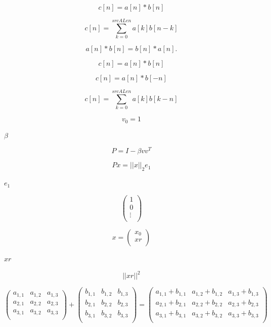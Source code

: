\documentclass{article}
\begin{document}
\[                     c[n] = a[n] * b[n]
\]
\pagebreak

\[                  c[n] = \sum_{k=0}^{srcALen} a[k] b[n-k]
\]
\pagebreak

\[                     a[n] * b[n] = b[n] * a[n].
\]
\pagebreak

\[                 c[n] = a[n] * b[n]
\]
\pagebreak

\[                 c[n] = a[n] * b[-n]
\]
\pagebreak

\[                 c[n] = \sum_{k=0}^{srcALen} a[k] b[k-n]
\]
\pagebreak

\[      v_0 = 1
\]
\pagebreak

$\beta$
\pagebreak

\[  P = I - \beta v v^T 
\]
\pagebreak

\[  P x = ||x||_2 e_1
\]
\pagebreak

$e_1$
\pagebreak

\[  \begin{pmatrix}
      1       \\
      0       \\
      \vdots  \\
  \end{pmatrix}
\]
\pagebreak

\[  x =
  \begin{pmatrix}
      x_0     \\
      xr      \\
  \end{pmatrix}
\]
\pagebreak

$xr$
\pagebreak

\[      ||xr||^2
\]
\pagebreak

\[\begin{pmatrix}
 a_{1,1} & a_{1,2} & a_{1,3} \\
 a_{2,1} & a_{2,2} & a_{2,3} \\
 a_{3,1} & a_{3,2} & a_{3,3} \\
\end{pmatrix}
+
\begin{pmatrix}
 b_{1,1} & b_{1,2} & b_{1,3} \\
 b_{2,1} & b_{2,2} & b_{2,3} \\
 b_{3,1} & b_{3,2} & b_{3,3} \\
\end{pmatrix}
=
\begin{pmatrix}
 a_{1,1}+b_{1,1} & a_{1,2}+b_{1,2} & a_{1,3}+b_{1,3} \\
 a_{2,1}+b_{2,1} & a_{2,2}+b_{2,2} & a_{2,3}+b_{2,3} \\
 a_{3,1}+b_{3,1} & a_{3,2}+b_{3,2} & a_{3,3}+b_{3,3} \\
\end{pmatrix}
\]
\pagebreak
\end{document}
